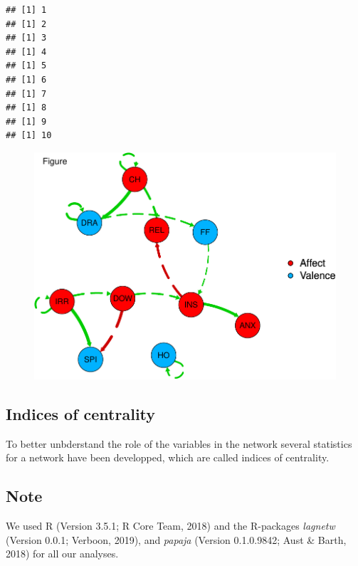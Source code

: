 \documentclass[man,floatsintext]{apa6}
\newenvironment{Shaded}{\begin{snugshade}}{\end{snugshade}}
\newcommand{\KeywordTok}[1]{\textcolor[rgb]{0.13,0.29,0.53}{\textbf{#1}}}
\newcommand{\OperatorTok}[1]{\textcolor[rgb]{0.81,0.36,0.00}{\textbf{#1}}}
\newcommand{\NormalTok}[1]{#1}
\begin{document}
\begin{verbatim}
## [1] 1
## [1] 2
## [1] 3
## [1] 4
## [1] 5
## [1] 6
## [1] 7
## [1] 8
## [1] 9
## [1] 10
\end{verbatim}

\begin{Shaded}
\end{Shaded}

\begin{figure}
\centering
\includegraphics{networkTutorial_files/figure-latex/example1-1.pdf}
\caption{}
\end{figure}

\subsection{Indices of centrality}\label{indices-of-centrality}

To better unbderstand the role of the variables in the network several
statistics for a network have been developped, which are called indices
of centrality.

\subsection{Note}\label{note}

We used R (Version 3.5.1; R Core Team, 2018) and the R-packages
\emph{lagnetw} (Version 0.0.1; Verboon, 2019), and \emph{papaja}
(Version 0.1.0.9842; Aust \& Barth, 2018) for all our analyses.
\end{document}
